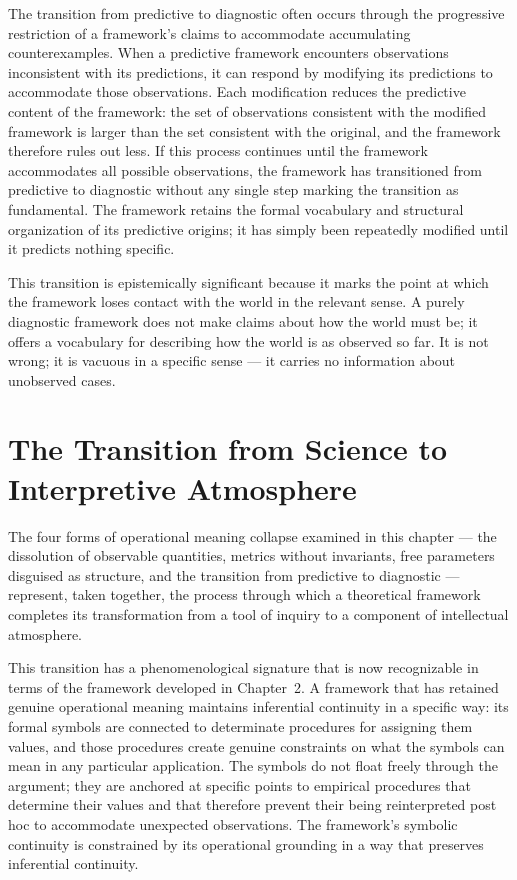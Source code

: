 \documentclass[12pt, openright, twoside]{book}
\begin{document}
The transition from predictive to diagnostic often
occurs through the progressive restriction of a
framework's claims to accommodate accumulating
counterexamples. When a predictive framework
encounters observations inconsistent with its
predictions, it can respond by modifying its
predictions to accommodate those observations.
Each modification reduces the predictive content
of the framework: the set of observations
consistent with the modified framework is larger
than the set consistent with the original, and
the framework therefore rules out less. If this
process continues until the framework accommodates
all possible observations, the framework has
transitioned from predictive to diagnostic without
any single step marking the transition as fundamental.
The framework retains the formal vocabulary and
structural organization of its predictive origins;
it has simply been repeatedly modified until it
predicts nothing specific.

This transition is epistemically significant because
it marks the point at which the framework loses
contact with the world in the relevant sense.
A purely diagnostic framework does not make
claims about how the world must be; it offers
a vocabulary for describing how the world is
as observed so far. It is not wrong; it is
vacuous in a specific sense --- it carries no
information about unobserved cases.

\section{The Transition from Science to Interpretive Atmosphere}

The four forms of operational meaning collapse examined
in this chapter --- the dissolution of observable
quantities, metrics without invariants, free parameters
disguised as structure, and the transition from
predictive to diagnostic --- represent, taken together,
the process through which a theoretical framework
completes its transformation from a tool of inquiry
to a component of intellectual atmosphere.

This transition has a phenomenological signature that
is now recognizable in terms of the framework developed
in Chapter~2. A framework that has retained genuine
operational meaning maintains inferential continuity
in a specific way: its formal symbols are connected
to determinate procedures for assigning them values,
and those procedures create genuine constraints on
what the symbols can mean in any particular application.
The symbols do not float freely through the argument;
they are anchored at specific points to empirical
procedures that determine their values and that therefore
prevent their being reinterpreted post hoc to accommodate
unexpected observations. The framework's symbolic
continuity is constrained by its operational grounding
in a way that preserves inferential continuity.
\end{document}
